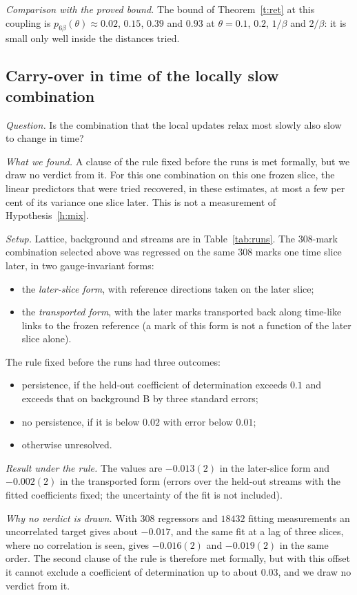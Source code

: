 \emph{Comparison with the proved bound.} The bound of Theorem~\ref{t:ret} at this coupling is
$p_{6\beta}(\theta)\approx0.02$, $0.15$, $0.39$ and $0.93$ at $\theta=0.1$, $0.2$, $1/\beta$ and $2/\beta$: it
is small only well inside the distances tried.

\subsection{Carry-over in time of the locally slow combination}\label{s:time}
\emph{Question.} Is the combination that the local updates relax most slowly also slow to change in time?

\emph{What we found.} A clause of the rule fixed before the runs is met formally, but we draw no verdict
from it. For
this one combination on this one frozen slice, the linear predictors that were tried recovered, in these estimates, at most a few
per cent of its variance one slice later. This is not a measurement of Hypothesis~\ref{h:mix}.

\emph{Setup.} Lattice, background and streams are in Table~\ref{tab:runs}. The $308$-mark combination
selected above was regressed on the same $308$ marks one time slice later, in two gauge-invariant forms:
\begin{itemize}
\item the \emph{later-slice form}, with reference directions taken on the later slice;
\item the \emph{transported form}, with the later marks transported back along time-like links to the frozen
reference (a mark of this form is not a function of the later slice alone).
\end{itemize}
The rule fixed before the runs had three outcomes:
\begin{itemize}
\item persistence, if the held-out coefficient of determination exceeds $0.1$ and exceeds that on
background \textsf{B} by three standard errors;
\item no persistence, if it is below $0.02$ with error below $0.01$;
\item otherwise unresolved.
\end{itemize}

\emph{Result under the rule.} The values are $-0.013(2)$ in the later-slice form and $-0.002(2)$ in the transported form (errors over the
held-out streams with the fitted coefficients fixed; the uncertainty of the fit is not included).

\emph{Why no verdict is drawn.} With $308$ regressors and $18432$ fitting measurements an uncorrelated target
gives about $-0.017$, and the same fit at a lag of three slices, where no correlation is seen, gives
$-0.016(2)$ and $-0.019(2)$ in the same order. The second clause of the rule is therefore met formally, but with this offset it
cannot exclude a coefficient of determination up to about $0.03$, and we draw no verdict from it.

